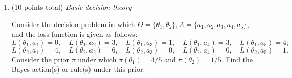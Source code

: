 \documentclass{article}
\begin{document}
\begin{enumerate}
\item  (10 points total) {\em Basic decision theory}

Consider the decision problem in which $\Theta = \{ \theta_1, \theta_2\}, 
A = \{a_1, a_2, a_3, a_4, a_5\}$, and the loss function is given as follows: 
$$L(\theta_1, a_1) = 0,\quad L(\theta_1, a_2) = 3,\quad L(\theta_1, a_3) = 1,\quad L(\theta_1, a_4) = 3,\quad
L(\theta_1, a_5) = 4;$$ 
$$L(\theta_2, a_1) = 4,\quad L(\theta_2, a_2) = 6,\quad L(\theta_2, a_3) = 0,\quad L(\theta_2, a_4) = 0,\quad
L(\theta_2, a_5) = 1.$$
Consider the prior $\pi$ under which $\pi(\theta_1) = 4/5$ and $\pi(\theta_2) = 1/5.$ Find the Bayes action(s) or rule(s) under this prior. 


\end{enumerate}
\end{document}
